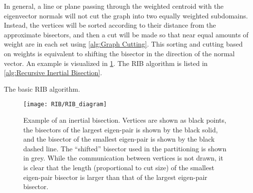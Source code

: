 {{{{        In general, a line or plane passing through the weighted centroid with the eigenvector normals will not cut the graph into two equally weighted subdomains.
        Instead, the vertices will be sorted according to their distance from the approximate bisectors, and then a cut will be made so that near equal amounts of weight are in each set using \cref{alg:Graph Cutting}.
        This sorting and cutting based on weights is equivalent to shifting the bisector in the direction of the normal vector.
        An example is visualized in \cref{fig:Spatial Decomposition:RIB Diagram}.
        The \ac{RIB} algorithm is listed in \cref{alg:Recursive Inertial Bisection}.

        \begin{algorithm}
          \centering
          \caption{The basic \acf{RIB} algorithm.}
          \label{alg:Recursive Inertial Bisection}
          \begin{algorithmic}[1]
               
            \EndProcedure
          \end{algorithmic}
        \end{algorithm}

        \begin{figure}
          \centering
          \texttt{[image: RIB/RIB\_diagram]}
          \caption{
            Example of an inertial bisection.
            Vertices are shown as black points, the bisectors of the largest eigen-pair is shown by the black solid, and the bisector of the smallest eigen-pair is shown by the black dashed line.
            The ``shifted'' bisector used in the partitioning is shown in grey.
            While the communication between vertices is not drawn, it is clear that the length (proportional to cut size) of the smallest eigen-pair bisector is larger than that of the largest eigen-pair bisector.
            \label{fig:Spatial Decomposition:RIB Diagram}
          }
        \end{figure}
      }
}}}
